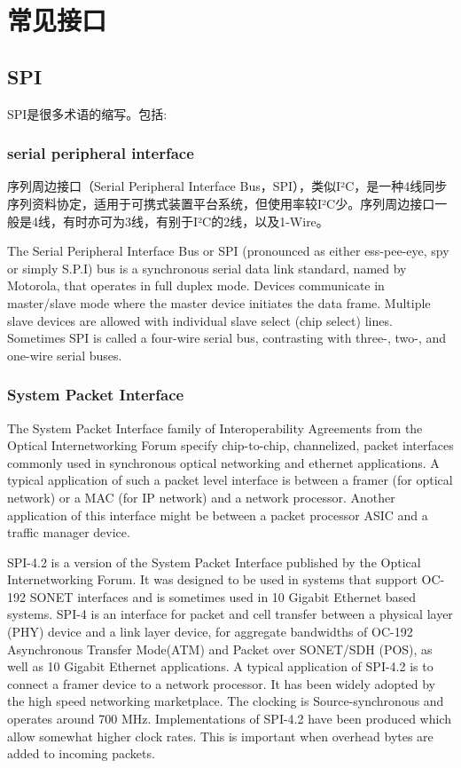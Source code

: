 \section{常见接口} 

\subsection{SPI}
SPI是很多术语的缩写。包括:
\subsubsection{serial peripheral interface}
序列周边接口（Serial Peripheral Interface Bus，SPI），类似I²C，是一种4线同步序列资料协定，适用于可携式装置平台系统，但使用率较I²C少。序列周边接口一般是4线，有时亦可为3线，有别于I²C的2线，以及1-Wire。

The Serial Peripheral Interface Bus or SPI (pronounced as either ess-pee-eye, spy or simply S.P.I) bus is a synchronous serial data link standard, named by Motorola, that operates in full duplex mode. Devices communicate in master/slave mode where the master device initiates the data frame. Multiple slave devices are allowed with individual slave select (chip select) lines. Sometimes SPI is called a four-wire serial bus, contrasting with three-, two-, and one-wire serial buses.
\subsubsection{System Packet Interface}
The System Packet Interface family of Interoperability Agreements from the Optical Internetworking Forum specify chip-to-chip, channelized, packet interfaces commonly used in synchronous optical networking and ethernet applications. A typical application of such a packet level interface is between a framer (for optical network) or a MAC (for IP network) and a network processor. Another application of this interface might be between a packet processor ASIC and a traffic manager device.

SPI-4.2 is a version of the System Packet Interface published by the Optical Internetworking Forum. It was designed to be used in systems that support OC-192 SONET interfaces and is sometimes used in 10 Gigabit Ethernet based systems.
SPI-4 is an interface for packet and cell transfer between a physical layer (PHY) device and a link layer device, for aggregate bandwidths of OC-192 Asynchronous Transfer Mode(ATM) and Packet over SONET/SDH (POS), as well as 10 Gigabit Ethernet applications.
A typical application of SPI-4.2 is to connect a framer device to a network processor. It has been widely adopted by the high speed networking marketplace.
The clocking is Source-synchronous and operates around 700 MHz. Implementations of SPI-4.2 have been produced which allow somewhat higher clock rates. This is important when overhead bytes are added to incoming packets.






